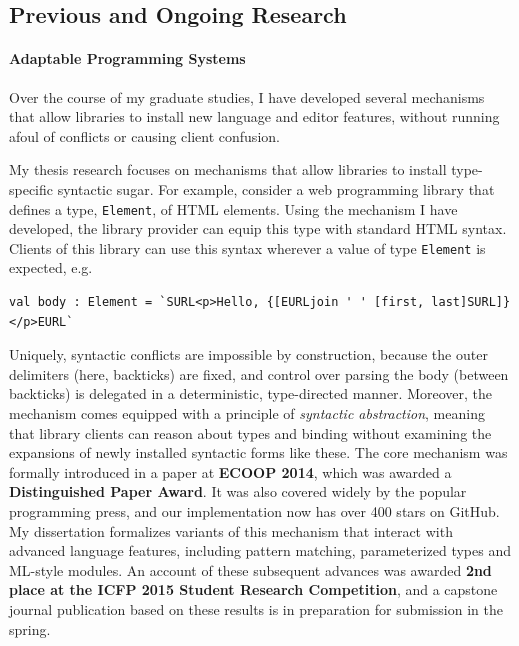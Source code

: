 \documentclass[9pt]{extarticle}
\let\li\lstinline
\begin{document}

\vspace{-8px}
\subsection*{Previous and Ongoing Research}
\vspace{-2px}
\paragraph{Adaptable Programming Systems}

Over the course of my graduate studies, I have developed several mechanisms that allow libraries to install new language and editor features, without running afoul of conflicts or causing client confusion.

My thesis research focuses on mechanisms that allow libraries to install type-specific syntactic sugar. For example, consider a web programming library that defines a type, \li{Element}, of HTML elements. Using the mechanism I have developed, the library provider can equip this type with standard HTML syntax. Clients of this library can use this syntax wherever a value of type \li{Element} is expected, e.g.
\begin{lstlisting}[numbers=none]
val body : Element = `SURL<p>Hello, {[EURLjoin ' ' [first, last]SURL]}</p>EURL`
\end{lstlisting}
Uniquely, syntactic conflicts are impossible by construction, because the outer delimiters (here, backticks) are fixed, and control over parsing the body (between backticks) is delegated in a deterministic, type-directed manner. Moreover, the mechanism comes equipped with a principle of \emph{syntactic abstraction}, meaning that library clients can reason about types and binding without examining the expansions of newly installed syntactic forms like these. The core mechanism was formally introduced in a paper at \textbf{ECOOP 2014}, which was awarded a \textbf{Distinguished Paper Award}. It was  also covered widely by the popular programming press, and our implementation now has over 400 stars on GitHub. 
My dissertation formalizes variants of this mechanism that interact with advanced language features, including pattern matching, parameterized types and ML-style modules. An account of these subsequent advances was awarded \textbf{2nd place at the ICFP 2015 Student Research Competition}, and a capstone journal publication based on these results is in preparation for submission in the spring.
\end{document}
